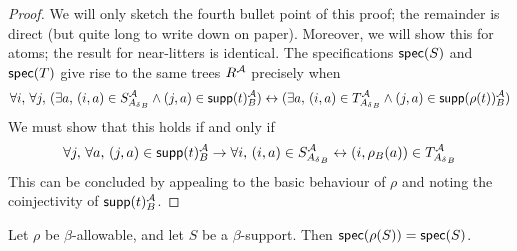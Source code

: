 \begin{proof}
  We will only sketch the fourth bullet point of this proof; the remainder is direct (but quite long to write down on paper).
  Moreover, we will show this for atoms; the result for near-litters is identical.
  The specifications \( \operatorname{\mathsf{spec}}(S) \) and \( \operatorname{\mathsf{spec}}(T) \) give rise to the same trees \( R^{\mathcal A} \) precisely when
  \[ \forall i,\, \forall j,\, (\exists a,\, (i, a) \in S_{{A_\delta}_B}^{\mathcal A} \wedge (j, a) \in \operatorname{\mathsf{supp}}(t)_B^{\mathcal A}) \leftrightarrow (\exists a,\, (i, a) \in T_{{A_\delta}_B}^{\mathcal A} \wedge (j, a) \in \operatorname{\mathsf{supp}}(\rho(t))_B^{\mathcal A}) \]
  We must show that this holds if and only if
  \[ \forall j,\, \forall a,\, (j, a) \in \operatorname{\mathsf{supp}}(t)_B^{\mathcal A} \to \forall i,\, (i, a) \in S_{{A_\delta}_B}^{\mathcal A} \leftrightarrow (i, \rho_B(a)) \in T_{{A_\delta}_B}^{\mathcal A} \]
  This can be concluded by appealing to the basic behaviour of \( \rho \) and noting the coinjectivity of \( \operatorname{\mathsf{supp}}(t)_B^{\mathcal A} \).
\end{proof}
\begin{proposition}
  \label{prop:spec_smul}
  Let \( \rho \) be \( \beta \)-allowable, and let \( S \) be a \( \beta \)-support.
  Then \( \operatorname{\mathsf{spec}}(\rho(S)) = \operatorname{\mathsf{spec}}(S) \).
\end{proposition}
